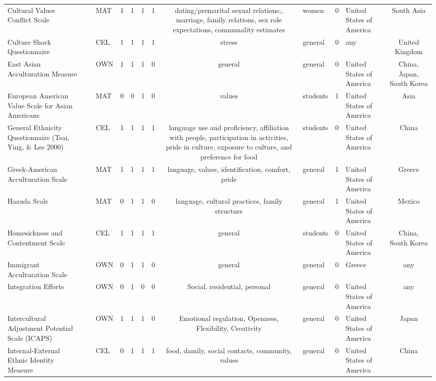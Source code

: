 \begin{longtable}[l]{lclclclclclc}
Cultural Values Conflict Scale & \ \citet{Inman2001} & MAT & 1 & 1 & 1 & 1 & dating/premarital sexual relations;, marriage, family relations, sex role expectations, communality estimates & women & 0 & United States of America & South Asia\\
Culture Shock Questionnaire & \ \citet{Mumford1998} & CEL & 1 & 1 & 1 & 1 & stress & general & 0 & any & United Kingdom\\
East Asian Acculturation Measure & \ \citet{Barry2001a} & OWN & 1 & 1 & 1 & 0 & general & general & 0 & United States of America & China, Japan, South Korea\\
European American Value Scale for Asian Americans & \ \citet{Wolfe2001} & MAT & 0 & 0 & 1 & 0 & values & students & 1 & United States of America & Asia\\
General Ethnicity Questionnaire (Tsai, Ying, \& Lee 2000) & \ \citet{Tsai2000} & CEL & 1 & 1 & 1 & 1 & language use and proficiency, affiliation with people, participation in activities, pride in culture, exposure to culture, and preference for food & students & 0 & United States of America & China\\
Greek-American Acculturation Scale & \ \citet{Harris1996} & MAT & 1 & 1 & 1 & 1 & language, values, identification, comfort, pride & general & 1 & United States of America & Greece\\
Hazuda Scale & \ \citet{Hazuda1988} & MAT & 0 & 1 & 1 & 0 & language, cultural practices, family structure & general & 1 & United States of America & Mexico\\
Homesickness and Contentment Scale & \ \citet{Shin1999} & CEL & 1 & 1 & 1 & 1 & general & students & 0 & United States of America & China, South Korea\\
Immigrant Acculturation Scale & \ \citet{Madianos2008} & OWN & 0 & 1 & 1 & 0 & general & general & 0 & Greece & any\\
Integration Efforts & \ \citet{Guest1993} & OWN & 0 & 1 & 0 & 0 & Social, residential, personal & general & 0 & United States of America & any\\
Intercultural Adjustment Potential Scale (ICAPS) & \ \citet{Matsumoto2001} & OWN & 1 & 1 & 1 & 0 & Emotional regulation, Openness, Flexibility, Creativity & general & 0 & United States of America & Japan\\
Internal-External Ethnic Identity Measure & \ \citet{Kwan1997} & CEL & 0 & 1 & 1 & 1 & food, damily, social contacts, community, values & general & 0 & United States of America & China\\

\end{longtable}
